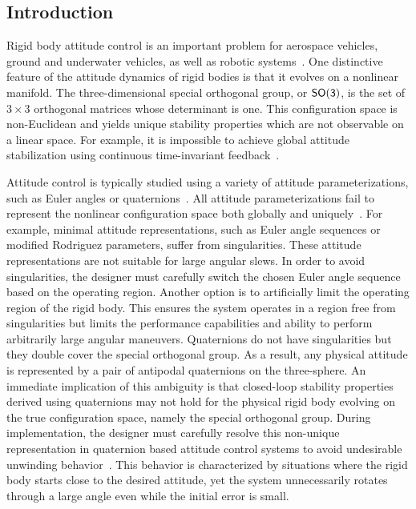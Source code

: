 \documentclass[fleqn]{IJCAS}  %
\begin{document}


\begin{multicols}{2}
\section{Introduction}\label{sec:intro}

Rigid body attitude control is an important problem for aerospace vehicles, ground and underwater vehicles, as well as robotic systems~\cite{hughes2004,wertz1978}.
One distinctive feature of the attitude dynamics of rigid bodies is that it evolves on a nonlinear manifold.
The three-dimensional special orthogonal group, or \( \mathsf{SO(3)} \), is the set of \( 3 \times 3 \) orthogonal matrices whose determinant is one.
This configuration space is non-Euclidean and yields unique stability properties which are not observable on a linear space.
For example, it is impossible to achieve global attitude stabilization using continuous time-invariant feedback~\cite{bhat2000}.



Attitude control is typically studied using a variety of attitude parameterizations, such as Euler angles or quaternions~\cite{shuster1993}.
All attitude parameterizations fail to represent the nonlinear configuration space both globally and uniquely~\cite{chaturvedi2011a}.
For example, minimal attitude representations, such as Euler angle sequences or modified Rodriguez parameters, suffer from singularities.
These attitude representations are not suitable for large angular slews.
In order to avoid singularities, the designer must carefully switch the chosen Euler angle sequence based on the operating region.
Another option is to artificially limit the operating region of the rigid body.
This ensures the system operates in a region free from singularities but limits the performance capabilities and ability to perform arbitrarily large angular maneuvers.
Quaternions do not have singularities but they double cover the special orthogonal group.
As a result, any physical attitude is represented by a pair of antipodal quaternions on the three-sphere.
An immediate implication of this ambiguity is that closed-loop stability properties derived using quaternions may not hold for the physical rigid body evolving on the true configuration space, namely the special orthogonal group.
During implementation, the designer must carefully resolve this non-unique representation in quaternion based attitude control systems to avoid undesirable unwinding behavior~\cite{bhat2000}.
This behavior is characterized by situations where the rigid body starts close to the desired attitude, yet the system unnecessarily rotates through a large angle even while the initial error is small.


\end{multicols}
\end{document}
